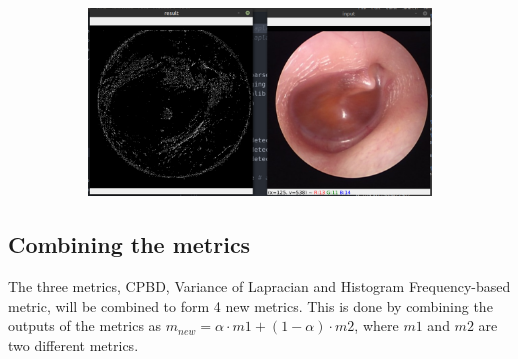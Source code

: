 \begin{figure}[H]
\begin{subfigure}[t]{0.6\textwidth}
        \caption{}
        \label{fig:LV_very_sharp}
    \end{subfigure}\hspace{1em}
    \caption{}
    \begin{subfigure}[t]{0.6\textwidth}
        \includegraphics[width=\textwidth]{Figures/BlurredImages/lv/lv_normal.png}
        \caption{}
    \end{subfigure}\hspace{1em}
\end{figure}




\subsection{Combining the metrics}
The three metrics, CPBD, Variance of Lapracian and Histogram Frequency-based metric, will be combined to form 4 new metrics. This is done by combining the outputs of the metrics as $m_{new}=\alpha \cdot m1 + (1-\alpha) \cdot m2$, where $m1$ and $m2$ are two different metrics.


